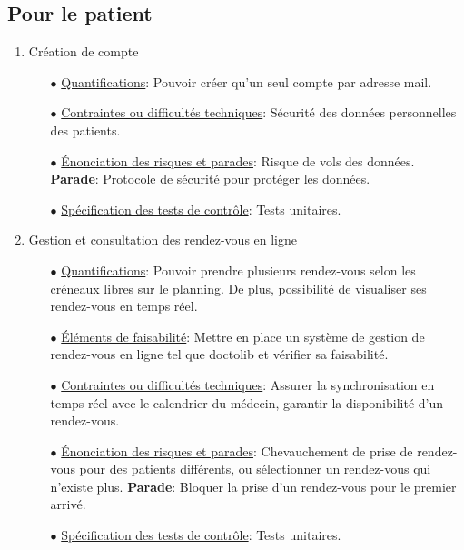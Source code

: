 \documentclass[a4paper]{report}
\begin{document}
\subsection{Pour le patient}
\begin{enumerate}
    \item Création de compte\newline
        \begin{itemize}
            \item[$\bullet$] \underline{Quantifications}: Pouvoir créer qu’un seul compte par adresse mail.
            \item[$\bullet$] \underline{Contraintes ou difficultés techniques}: Sécurité des données personnelles des patients.
            \item[$\bullet$] \underline{Énonciation des risques et parades}: Risque de vols des données.\newline
            \textbf{Parade}: Protocole de sécurité pour protéger les données.
            \item[$\bullet$] \underline{Spécification des tests de contrôle}: Tests unitaires.\newline
        \end{itemize}

    \item Gestion et consultation des rendez-vous en ligne\newline
    \begin{itemize}
        \item[$\bullet$] \underline{Quantifications}: Pouvoir prendre plusieurs rendez-vous selon les créneaux libres sur le planning. 
        De plus, possibilité de visualiser ses rendez-vous en temps réel.
        \item[$\bullet$] \underline{Éléments de faisabilité}: Mettre en place un système de gestion de rendez-vous en ligne tel que doctolib et vérifier sa faisabilité.
        \item[$\bullet$] \underline{Contraintes ou difficultés techniques}: Assurer la synchronisation en temps réel avec le calendrier du médecin, garantir la disponibilité d’un rendez-vous.
        \item[$\bullet$] \underline{Énonciation des risques et parades}: Chevauchement de prise de rendez-vous pour des patients différents, ou sélectionner un rendez-vous qui n'existe plus.\newline
        \textbf{Parade}: Bloquer la prise d’un rendez-vous pour le premier arrivé.
        \item[$\bullet$] \underline{Spécification des tests de contrôle}: Tests unitaires.
    \end{itemize}
        
\end{enumerate}
\end{document}
